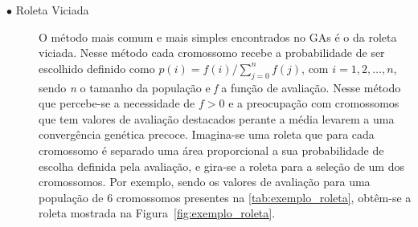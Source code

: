 \begin{description}
	\item[$\bullet$ Roleta Viciada] \text{}
	
O método mais comum e mais simples encontrados no GAs é o da roleta viciada. Nesse método cada cromossomo recebe a probabilidade de ser escolhido definido como \(p(i) = f(i) / \sum_{j=0}^{n}f(j)\), com \(i = 1,2,\dots,n\), sendo \textit{n} o tamanho da população e \textit{f} a função de avaliação. Nesse método que percebe-se a necessidade de \(f > 0\) e a preocupação com cromossomos que tem valores de avaliação destacados perante a média levarem a uma convergência genética precoce. Imagina-se uma roleta que para cada cromossomo é separado uma área proporcional a sua probabilidade de escolha definida pela avaliação, e gira-se a roleta para a seleção de um dos cromossomos. Por exemplo, sendo os valores de avaliação para uma população de 6 cromossomos presentes na \autoref{tab:exemplo_roleta}, obtêm-se a roleta mostrada na Figura~\ref{fig:exemplo_roleta}.


\end{description}
